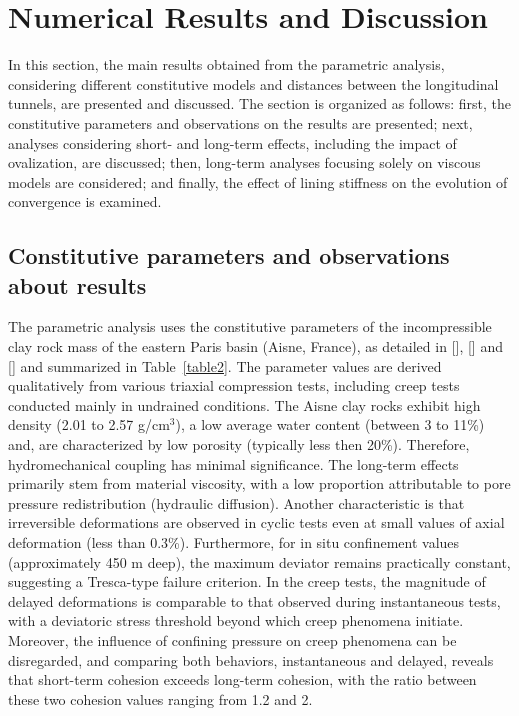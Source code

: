 \documentclass[a4paper,fleqn]{cas-sc}
\begin{document}
\section{Numerical Results and Discussion}\label{}

In this section, the main results obtained from the parametric analysis, considering different constitutive models and distances between the longitudinal tunnels, are presented and discussed. The section is organized as follows: first, the constitutive parameters and observations on the results are presented; next, analyses considering short- and long-term effects, including the impact of ovalization, are discussed; then, long-term analyses focusing solely on viscous models are considered; and finally, the effect of lining stiffness on the evolution of convergence is examined.

\subsection{Constitutive parameters and observations about results}\label{}

The parametric analysis uses the constitutive parameters of the incompressible clay rock mass of the eastern Paris basin (Aisne, France), as detailed in [], [] and [] and summarized in Table~\ref{table2}. The parameter values are derived qualitatively from various triaxial compression tests, including creep tests conducted mainly in undrained conditions. The Aisne clay rocks exhibit high density  (2.01 to 2.57 g/cm$^3$), a low average water content (between 3 to 11\%) and, are characterized by low porosity (typically less then 20\%). Therefore, hydromechanical coupling has minimal significance. The long-term effects primarily stem from material viscosity, with a low proportion attributable to pore pressure redistribution (hydraulic diffusion). Another characteristic is that irreversible deformations are observed in cyclic tests even at small values of axial deformation (less than 0.3\%). Furthermore, for in situ confinement values (approximately 450 m deep), the maximum deviator remains practically constant, suggesting a Tresca-type failure criterion. In the creep tests, the magnitude of delayed deformations is comparable to that observed during instantaneous tests, with a deviatoric stress threshold beyond which creep phenomena initiate. Moreover, the influence of confining pressure on creep phenomena can be disregarded, and comparing both behaviors, instantaneous and delayed, reveals that short-term cohesion exceeds long-term cohesion, with the ratio between these two cohesion values ranging from 1.2 and 2. 
\end{document}

